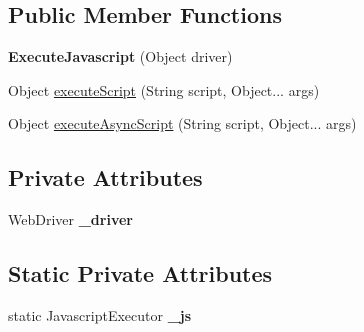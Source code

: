 \subsection*{Public Member Functions}
\begin{DoxyCompactItemize}
\item 
\hypertarget{classcom_1_1zeuslearning_1_1automation_1_1selenium_1_1interactions_1_1ExecuteJavascript_abb15a9bf9e3c42d8854f4adf2e653724}{}\label{classcom_1_1zeuslearning_1_1automation_1_1selenium_1_1interactions_1_1ExecuteJavascript_abb15a9bf9e3c42d8854f4adf2e653724} 
{\bfseries Execute\+Javascript} (Object driver)
\item 
Object \hyperlink{classcom_1_1zeuslearning_1_1automation_1_1selenium_1_1interactions_1_1ExecuteJavascript_adc7cfbadf6cfb984c5487e8bcab549d9}{execute\+Script} (String script, Object... args)
\item 
Object \hyperlink{classcom_1_1zeuslearning_1_1automation_1_1selenium_1_1interactions_1_1ExecuteJavascript_a5495b96ea1c285d54c93c10d09348c14}{execute\+Async\+Script} (String script, Object... args)
\end{DoxyCompactItemize}
\subsection*{Private Attributes}
\begin{DoxyCompactItemize}
\item 
\hypertarget{classcom_1_1zeuslearning_1_1automation_1_1selenium_1_1interactions_1_1ExecuteJavascript_a90df76cddcf7e9147339f5c322025e49}{}\label{classcom_1_1zeuslearning_1_1automation_1_1selenium_1_1interactions_1_1ExecuteJavascript_a90df76cddcf7e9147339f5c322025e49} 
Web\+Driver {\bfseries \+\_\+driver}
\end{DoxyCompactItemize}
\subsection*{Static Private Attributes}
\begin{DoxyCompactItemize}
\item 
\hypertarget{classcom_1_1zeuslearning_1_1automation_1_1selenium_1_1interactions_1_1ExecuteJavascript_aa85a99853a82511a5e8b6754b8d04d6b}{}\label{classcom_1_1zeuslearning_1_1automation_1_1selenium_1_1interactions_1_1ExecuteJavascript_aa85a99853a82511a5e8b6754b8d04d6b} 
static Javascript\+Executor {\bfseries \+\_\+js}
\end{DoxyCompactItemize}


